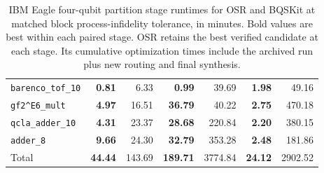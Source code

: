 \begin{table}[p]
\begin{tabular}{l|rrr|rrr}
\texttt{barenco\_tof\_10} & \textbf{0.81} & 6.33 & \textbf{0.99} & 39.69 & \textbf{1.98} & 49.16 \\
\texttt{gf2\textasciicircum{}E6\_mult} & \textbf{4.97} & 16.51 & \textbf{36.79} & 40.22 & \textbf{2.75} & 470.18 \\
\texttt{qcla\_adder\_10} & \textbf{4.31} & 23.37 & \textbf{28.68} & 220.84 & \textbf{2.20} & 380.15 \\
\texttt{adder\_8} & \textbf{9.66} & 24.30 & \textbf{32.79} & 353.28 & \textbf{2.48} & 181.86 \\
\hline
Total & \textbf{44.44} & 143.69 & \textbf{189.71} & 3774.84 & \textbf{24.12} & 2902.52 \\
\hline
\end{tabular}
\caption{IBM Eagle four-qubit partition stage runtimes for OSR and BQSKit at matched block process-infidelity tolerance, in minutes. Bold values are best within each paired stage. OSR retains the best verified candidate at each stage. Its cumulative optimization times include the archived run plus new routing and final synthesis.}
\label{tab:osr-bqskit-four-qubit-ibm-eagle-times}
\end{table}

